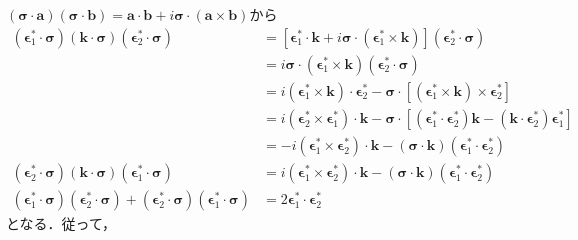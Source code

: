 $(\boldsymbol\sigma \cdot \boldsymbol{a}) (\boldsymbol\sigma \cdot \boldsymbol{b}) = \boldsymbol{a} \cdot \boldsymbol{b} + i \boldsymbol\sigma \cdot (\boldsymbol{a} \times \boldsymbol{b})$から
\begin{align*}
  (\boldsymbol{\epsilon}_1^\ast \cdot \boldsymbol\sigma)(\boldsymbol{k}\cdot\boldsymbol\sigma)(\boldsymbol{\epsilon}_2^\ast \cdot \boldsymbol\sigma)
  &= [\boldsymbol{\epsilon}_1^\ast \cdot \boldsymbol{k} + i \boldsymbol\sigma \cdot (\boldsymbol{\epsilon}_1^\ast \times \boldsymbol{k})](\boldsymbol{\epsilon}_2^\ast \cdot \boldsymbol\sigma) \\
  &= i \boldsymbol\sigma \cdot (\boldsymbol{\epsilon}_1^\ast \times \boldsymbol{k})(\boldsymbol{\epsilon}_2^\ast \cdot \boldsymbol\sigma) \\
  &= i (\boldsymbol{\epsilon}_1^\ast \times \boldsymbol{k}) \cdot \boldsymbol{\epsilon}_2^\ast - \boldsymbol\sigma \cdot [(\boldsymbol{\epsilon}_1^\ast \times \boldsymbol{k}) \times \boldsymbol{\epsilon}_2^\ast] \\
  &= i (\boldsymbol{\epsilon}_2^\ast \times \boldsymbol{\epsilon}_1^\ast) \cdot \boldsymbol{k} - \boldsymbol\sigma \cdot [(\boldsymbol{\epsilon}_1^\ast \cdot \boldsymbol{\epsilon}_2^\ast) \boldsymbol{k} - (\boldsymbol{k} \cdot \boldsymbol{\epsilon}_2^\ast) \boldsymbol{\epsilon}_1^\ast] \\
  &= - i (\boldsymbol{\epsilon}_1^\ast \times \boldsymbol{\epsilon}_2^\ast) \cdot \boldsymbol{k}
  - (\boldsymbol\sigma \cdot \boldsymbol{k})(\boldsymbol{\epsilon}_1^\ast \cdot \boldsymbol{\epsilon}_2^\ast) \\
  (\boldsymbol{\epsilon}_2^\ast \cdot \boldsymbol\sigma)(\boldsymbol{k}\cdot\boldsymbol\sigma)(\boldsymbol{\epsilon}_1^\ast \cdot \boldsymbol\sigma)
  &=  i (\boldsymbol{\epsilon}_1^\ast \times \boldsymbol{\epsilon}_2^\ast) \cdot \boldsymbol{k}
  - (\boldsymbol\sigma \cdot \boldsymbol{k})(\boldsymbol{\epsilon}_1^\ast \cdot \boldsymbol{\epsilon}_2^\ast) \\
  (\boldsymbol{\epsilon}_1^\ast \cdot \boldsymbol\sigma)(\boldsymbol{\epsilon}_2^\ast \cdot \boldsymbol\sigma)
  + (\boldsymbol{\epsilon}_2^\ast \cdot \boldsymbol\sigma)(\boldsymbol{\epsilon}_1^\ast \cdot \boldsymbol\sigma)
  &= 2 \boldsymbol{\epsilon}_1^\ast \cdot \boldsymbol{\epsilon}_2^\ast
\end{align*}
となる．従って，
